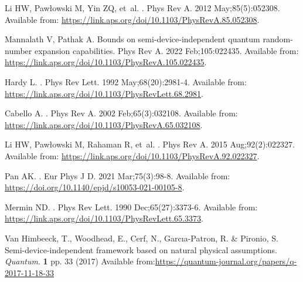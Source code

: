 \documentclass[]{interact}
\theoremstyle{plain}%
\theoremstyle{definition}
\theoremstyle{remark}
\begin{document}
\begin{thebibliography}{100}
Li HW, Paw{\l}owski M, Yin ZQ, et~al.
.
\newblock Phys Rev A. 2012 May;85(5):052308.
\newblock Available from:
  \url{https://link.aps.org/doi/10.1103/PhysRevA.85.052308}.

Mannalath V, Pathak A.
\newblock Bounds on semi-device-independent quantum random-number expansion
  capabilities.
\newblock Phys Rev A. 2022 Feb;105:022435.
\newblock Available from:
  \url{https://link.aps.org/doi/10.1103/PhysRevA.105.022435}.

Hardy L.
.
\newblock Phys Rev Lett. 1992 May;68(20):2981-4.
\newblock Available from:
  \url{https://link.aps.org/doi/10.1103/PhysRevLett.68.2981}.

Cabello A.
.
\newblock Phys Rev A. 2002 Feb;65(3):032108.
\newblock Available from:
  \url{https://link.aps.org/doi/10.1103/PhysRevA.65.032108}.

Li HW, Paw{\l}owski M, Rahaman R, et~al.
.
\newblock Phys Rev A. 2015 Aug;92(2):022327.
\newblock Available from:
  \url{https://link.aps.org/doi/10.1103/PhysRevA.92.022327}.

Pan AK.
.
\newblock Eur Phys J D. 2021 Mar;75(3):98-8.
\newblock Available from:
  \url{https://doi.org/10.1140/epjd/s10053-021-00105-8}.

Mermin ND.
.
\newblock Phys Rev Lett. 1990 Dec;65(27):3373-6.
\newblock Available from:
  \url{https://link.aps.org/doi/10.1103/PhysRevLett.65.3373}.



Van Himbeeck, T., Woodhead, E., Cerf, N., Garcıa-Patron, R. \& Pironio, S. Semi-device-independent framework based on natural physical assumptions. {\em Quantum}. \textbf{1} pp. 33 (2017)
\newblock Available from:\url{https://quantum-journal.org/papers/q-2017-11-18-33}


\end{thebibliography}
\end{document}
